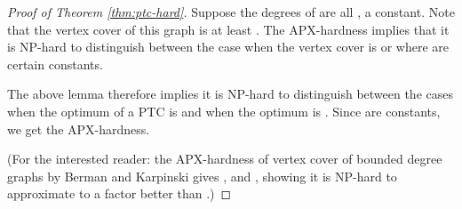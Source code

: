 \documentclass[11pt]{article}
\newcommand{\1}{\mathbb{1}}
\begin{document}
{\begin{proof}[Proof of Theorem \ref{thm:ptc-hard}]
  Suppose the degrees of  are all , a constant.  Note that the
  vertex cover of this graph is at least .  The
  APX-hardness implies that it is NP-hard to distinguish between the
  case when the vertex cover is  or  where  are certain constants.

  The above lemma therefore implies it is NP-hard to distinguish
  between the cases when the optimum of a PTC is  and when the optimum is . Since
   are constants, we get the APX-hardness.

  (For the interested reader: the APX-hardness of vertex cover of
  bounded degree graphs by Berman and Karpinski \cite{BK98} gives
  ,  and , showing it is NP-hard to
  approximate to a factor better than .)
\end{proof}
}
\end{document}
